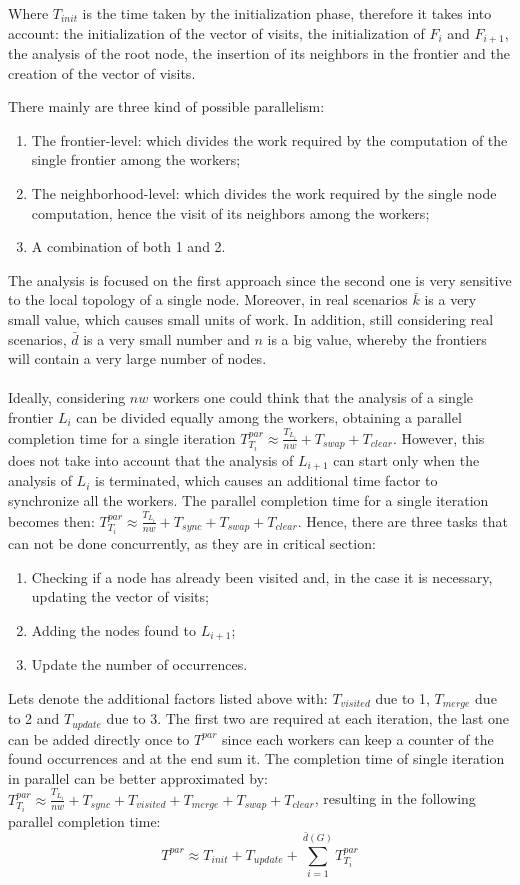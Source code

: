Where $T_{init}$ is the time taken by the
initialization phase, therefore it takes into account: the initialization of the 
vector of visits, the initialization of $F_i$ and $F_{i+1}$, the analysis 
of the root node, the insertion of its neighbors in the frontier and 
the creation of the vector of visits.

There mainly are three kind of possible parallelism:
\begin{enumerate}
    \item The frontier-level: which divides 
    the work required by the computation of the single frontier among the workers;
    \item The neighborhood-level: which divides the work required by the single
    node computation, hence the visit of its neighbors among the workers;
    \item A combination of both 1 and 2.
\end{enumerate}
The analysis is focused on the first approach since the second
one is very sensitive to the local topology of a single node. 
Moreover, 
in real scenarios $\bar{k}$ is a very small value, which causes small units of work. 
In addition, still considering real scenarios, $\bar{d}$ is a very small number
 and $n$ is a big value, 
whereby the frontiers will contain a very large number of nodes.
\\
\\
Ideally, considering $nw$ workers one could think that the analysis of a single
frontier $L_i$ can be divided equally among the workers, obtaining a parallel
completion time for a single iteration $T^{par}_{T_i} \approx \frac{T_{L_i}}{nw} + T_{swap} + T_{clear}$. 
However, this does not take into account that the analysis of
$L_{i+1}$ can start only when the analysis of $L_{i}$ is terminated,
which causes an additional time factor to synchronize all the workers. 
The parallel completion time for a single iteration becomes then:
$T^{par}_{T_i} \approx \frac{T_{L_i}}{nw} + T_{sync} + T_{swap} + T_{clear}$.
Hence, 
there are three tasks that can not be done concurrently, 
as they are in critical section:
\begin{enumerate}
    \item Checking if a node has already been visited and, in the case it is 
    necessary, updating the vector of visits;
    \item Adding the nodes found to $L_{i+1}$;
    \item Update the number of occurrences.
\end{enumerate}
Lets denote the additional factors listed above with:
 $T_{visited}$ due to 1, $T_{merge}$ due to 2 and $T_{update}$ due to 3.
 The first two are required at each iteration, the last one can be 
 added directly once to $T^{par}$ since each workers
 can keep a counter of the found occurrences and at the end sum it.
 The completion time of single iteration in parallel can be better 
 approximated by: $T^{par}_{T_i} \approx \frac{T_{L_i}}{nw} 
 + T_{sync}
  + T_{visited} + T_{merge} + T_{swap} + T_{clear}$, resulting in the following 
  parallel completion time: 
  $$
  T^{par} \approx T_{init} + T_{update} + \sum^{\bar{d}(G)}_{i=1} T^{par}_{T_i}
  $$




